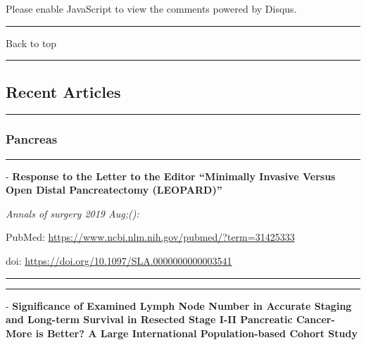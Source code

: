 \documentclass[]{article}
\begin{document}
Please enable JavaScript to view the comments powered by Disqus.

\begin{center}\rule{0.5\linewidth}{\linethickness}\end{center}

Back to top

\begin{center}\rule{0.5\linewidth}{\linethickness}\end{center}

\pagebreak

\hypertarget{recent-articles}{%
\subsection{Recent Articles}\label{recent-articles}}

\begin{center}\rule{0.5\linewidth}{\linethickness}\end{center}

\hypertarget{pancreas}{%
\subsubsection{Pancreas}\label{pancreas}}

\begin{center}\rule{0.5\linewidth}{\linethickness}\end{center}

 - \textbf{Response to the Letter to the Editor ``Minimally Invasive
Versus Open Distal Pancreatectomy (LEOPARD)''}

\emph{Annals of surgery 2019 Aug;():}

PubMed: \url{https://www.ncbi.nlm.nih.gov/pubmed/?term=31425333}

doi: \url{https://doi.org/10.1097/SLA.0000000000003541}

{}

{}

\begin{center}\rule{0.5\linewidth}{\linethickness}\end{center}

\begin{center}\rule{0.5\linewidth}{\linethickness}\end{center}

 - \textbf{Significance of Examined Lymph Node Number in Accurate
Staging and Long-term Survival in Resected Stage I-II Pancreatic
Cancer-More is Better? A Large International Population-based Cohort
Study}
\end{document}
